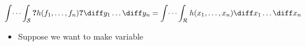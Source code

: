 \begin{frame}
\begin{columns}
\end{columns}
$\displaystyle \int\dots\int_{\mathcal S} \textbf{?} h(f_1,\dots, f_n) \textbf{?}  \diff y_1 \dots \diff y_n   =\int\dots\int_{\mathcal R} h(x_1,\dots, x_n)\diff x_1 \dots \diff x_n$
 
\begin{itemize}
\item Suppose we want to make variable 
\end{itemize}

\end{frame}